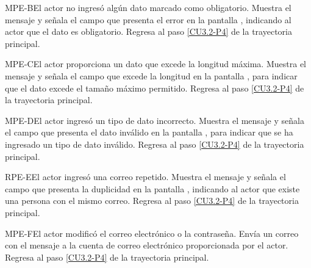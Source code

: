
	\begin{UCtrayectoriaA}{MPE-B}{El actor no ingresó algún dato marcado como obligatorio.}
		\UCpaso[\UCsist] Muestra el mensaje  y señala el campo que presenta el error en la pantalla , indicando al actor que el dato es obligatorio.
		\UCpaso Regresa al paso \ref{CU3.2-P4} de la trayectoria principal.
	\end{UCtrayectoriaA}

	\begin{UCtrayectoriaA}{MPE-C}{El actor proporciona un dato que excede la longitud máxima.}
		\UCpaso[\UCsist] Muestra el mensaje  y señala el campo que excede la longitud en la pantalla , para indicar que el dato excede el tamaño máximo permitido.
		\UCpaso Regresa al paso \ref{CU3.2-P4} de la trayectoria principal.
	\end{UCtrayectoriaA}
	
	\begin{UCtrayectoriaA}{MPE-D}{El actor ingresó un tipo de dato incorrecto.}
		\UCpaso[\UCsist] Muestra el mensaje  y señala el campo que presenta el dato inválido en la pantalla , para indicar que se ha ingresado un tipo de dato inválido.
		\UCpaso Regresa al paso \ref{CU3.2-P4} de la trayectoria principal.
	\end{UCtrayectoriaA}

	\begin{UCtrayectoriaA}{RPE-E}{El actor ingresó una correo repetido.}
		\UCpaso[\UCsist] Muestra el mensaje  y señala el campo que presenta la duplicidad en la pantalla , indicando al actor que existe una persona con el mismo correo.
		\UCpaso Regresa al paso \ref{CU3.2-P4} de la trayectoria principal.
	\end{UCtrayectoriaA}


	\begin{UCtrayectoriaA}{MPE-F}{El actor modificó el correo electrónico o la contraseña.}
		\UCpaso[\UCsist] Envía un correo con el mensaje  a la cuenta de correo electrónico proporcionada por el actor.
		\UCpaso Regresa al paso \ref{CU3.2-P4} de la trayectoria principal.
	\end{UCtrayectoriaA}